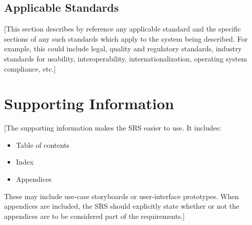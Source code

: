 \documentclass[a4paper,12pt,chapterprefix=false,bibliography=totoc,listof=totoc]{scrreprt}
\begin{document}
\section{Applicable Standards}
[This section describes by reference any applicable standard and the specific sections of any such standards which apply to the system being described. For example, this could include legal, quality and regulatory standards, industry standards for usability, interoperability, internationalization, operating system compliance, etc.]

\chapter{Supporting Information}
[The supporting information makes the SRS easier to use.  It includes:
\begin{itemize}
	\item Table of contents
	\item  Index
	\item Appendices
\end{itemize}
These may include use-case storyboards or user-interface prototypes. When appendices are included, the SRS should explicitly state whether or not the appendices are to be considered part of the requirements.]
\end{document}
